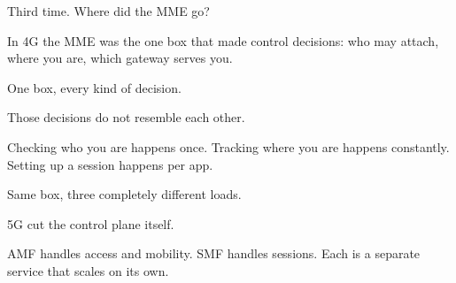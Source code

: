 \begin{frame}{Third time. Where did the MME go?}
  \gonebox
    {In 4G the MME was the one box that made control decisions: who may
     attach, where you are, which gateway serves you.

     \vspace{0.4em}
     One box, every kind of decision.}
    {Those decisions do not resemble each other.

     \vspace{0.4em}
     Checking who you are happens once. Tracking where you are happens
     constantly. Setting up a session happens per app.

     \vspace{0.4em}
     Same box, three completely different loads.}
    {5G cut the control plane itself.

     \vspace{0.4em}
     AMF handles access and mobility. SMF handles sessions. Each is a
     separate service that scales on its own.}

  \vspace{0.5em}

\end{frame}

